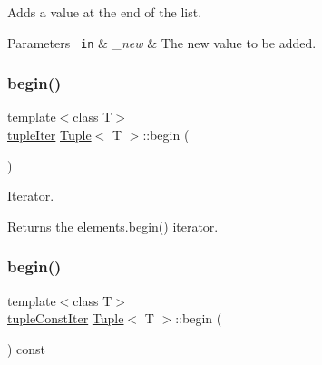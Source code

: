 Adds a value at the end of the list. 


\begin{DoxyParams}[1]{Parameters}
\mbox{\texttt{ in}}  & {\em \+\_\+new} & The new value to be added. \\
\hline
\end{DoxyParams}
\mbox{\label{class_tuple_a205dfb3c3dcad03ced830b5c9687d225}} 
\subsubsection{\texorpdfstring{begin()}{begin()}\hspace{0.1cm}{\footnotesize\ttfamily [1/2]}}
{\footnotesize\ttfamily template$<$class T$>$ \\
\mbox{\hyperlink{maths_8hh_ad22dcdeefda7d41523cc1604953eb6cc}{tuple\+Iter}} \mbox{\hyperlink{class_tuple}{Tuple}}$<$ T $>$\+::begin (\begin{DoxyParamCaption}{ }\end{DoxyParamCaption})\hspace{0.3cm}{\ttfamily [inline]}}



Iterator. 

\begin{DoxyReturn}{Returns}
the elements.\+begin() iterator. 
\end{DoxyReturn}
\mbox{\label{class_tuple_ab5d618dac69995db6adb0e657cd73bb3}} 
\subsubsection{\texorpdfstring{begin()}{begin()}\hspace{0.1cm}{\footnotesize\ttfamily [2/2]}}
{\footnotesize\ttfamily template$<$class T$>$ \\
\mbox{\hyperlink{maths_8hh_a2eba794860251c1b30e532df32ee4d1b}{tuple\+Const\+Iter}} \mbox{\hyperlink{class_tuple}{Tuple}}$<$ T $>$\+::begin (\begin{DoxyParamCaption}{ }\end{DoxyParamCaption}) const\hspace{0.3cm}{\ttfamily [inline]}}



